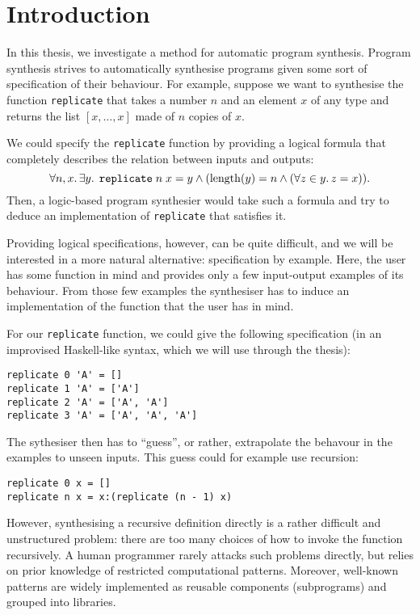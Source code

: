 \lstset{style=plain}

\chapter{Introduction}\label{ch:introduction}
In this thesis, we investigate a method for automatic program synthesis.  Program synthesis strives to automatically synthesise programs given some sort of specification of their behaviour.   For example, suppose we want to synthesise the function \lstinline!replicate! that takes a number $n$ and an element $x$ of any type and returns the list $[x, \dots, x]$ made of $n$ copies of $x$.

We could specify the \lstinline!replicate! function by providing a logical formula that completely describes the relation between inputs and outputs: \[ \forall n, x \ldotp \exists y \ldotp \; \texttt{replicate} \; n \; x = y \land (\mathrm{length}(y) = n \land (\forall z \in y \ldotp z = x)). \]  Then, a logic-based program synthesier would take such a formula and try to deduce an implementation of \lstinline!replicate! that satisfies it.

Providing logical specifications, however, can be quite difficult, and we will be interested in a more natural alternative: specification by example.  Here, the user has some function in mind and provides only a few input-output examples of its behaviour.  From those few examples the synthesiser has to induce an implementation of the function that the user has in mind.

For our \lstinline!replicate! function, we could give the following specification (in an improvised Haskell-like syntax, which we will use through the thesis):
\begin{lstlisting}[style=plain]
replicate 0 'A' = []
replicate 1 'A' = ['A']
replicate 2 'A' = ['A', 'A']
replicate 3 'A' = ['A', 'A', 'A']
\end{lstlisting}
The sythesiser then has to ``guess'', or rather, extrapolate the behavour in the examples to unseen inputs.  This guess could for example use recursion:
\begin{lstlisting}[style=plain]
replicate 0 x = []
replicate n x = x:(replicate (n - 1) x)
\end{lstlisting}

However, synthesising a recursive definition directly is a rather difficult and unstructured problem: there are too many choices of how to invoke the function recursively.  A human programmer rarely attacks such problems directly, but relies on prior knowledge of restricted computational patterns.  Moreover, well-known patterns are widely implemented as reusable components (subprograms) and grouped into libraries.

